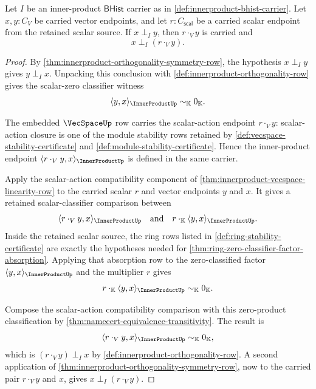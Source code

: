 \begin{theorem}
\label{thm:innerproduct-orthogonality-right-scalar-action-closure}
Let $I$ be an inner-product $\mathsf{BHist}$ carrier as in
\autoref{def:innerproduct-bhist-carrier}. Let $x,y:C_V$ be carried vector
endpoints, and let $r:C_{\mathsf{scal}}$ be a carried scalar endpoint from the
retained scalar source. If $x\perp_I y$, then $r\cdot_V y$ is carried and
$$
x\perp_I (r\cdot_V y).
$$
\end{theorem}
\begin{proof}
By \autoref{thm:innerproduct-orthogonality-symmetry-row}, the hypothesis
$x\perp_I y$ gives $y\perp_I x$. Unpacking this conclusion with
\autoref{def:innerproduct-orthogonality-row} gives the scalar-zero classifier
witness
$$
\langle y,x\rangle_{\InnerProductUp}\sim_{\mathbb{K}}0_{\mathbb{K}}.
$$

The embedded $\VecSpaceUp$ row carries the scalar-action endpoint
$r\cdot_V y$: scalar-action closure is one of the module stability rows retained
by \autoref{def:vecspace-stability-certificate} and
\autoref{def:module-stability-certificate}. Hence the inner-product endpoint
$\langle r\cdot_V y,x\rangle_{\InnerProductUp}$ is defined in the same carrier.

Apply the scalar-action compatibility component of
\autoref{thm:innerproduct-vecspace-linearity-row} to the carried scalar $r$ and
vector endpoints $y$ and $x$. It gives a retained scalar-classifier comparison
between
$$
\langle r\cdot_V y,x\rangle_{\InnerProductUp}
\quad\text{and}\quad
r\cdot_{\mathbb{K}}\langle y,x\rangle_{\InnerProductUp}.
$$
Inside the retained scalar source, the ring rows listed in
\autoref{def:ring-stability-certificate} are exactly the hypotheses needed for
\autoref{thm:ring-zero-classifier-factor-absorption}. Applying that absorption
row to the zero-classified factor $\langle y,x\rangle_{\InnerProductUp}$ and the
multiplier $r$ gives
$$
r\cdot_{\mathbb{K}}\langle y,x\rangle_{\InnerProductUp}
\sim_{\mathbb{K}}0_{\mathbb{K}}.
$$

Compose the scalar-action compatibility comparison with this zero-product
classification by \autoref{thm:namecert-equivalence-transitivity}. The result is
$$
\langle r\cdot_V y,x\rangle_{\InnerProductUp}
\sim_{\mathbb{K}}0_{\mathbb{K}},
$$
which is $(r\cdot_V y)\perp_I x$ by
\autoref{def:innerproduct-orthogonality-row}. A second application of
\autoref{thm:innerproduct-orthogonality-symmetry-row}, now to the carried pair
$r\cdot_V y$ and $x$, gives $x\perp_I(r\cdot_V y)$.
\end{proof}

